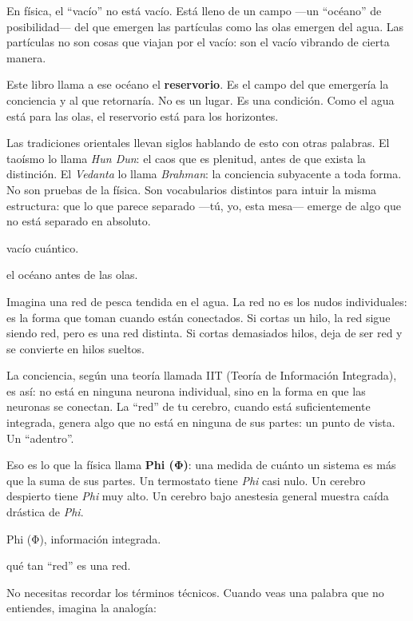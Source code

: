 En física, el “vacío” no está vacío. Está lleno de un campo —un “océano” de posibilidad— del que emergen las partículas como las olas emergen del agua. Las partículas no son cosas que viajan por el vacío: son el vacío vibrando de cierta manera.

Este libro llama a ese océano el \textbf{reservorio}. Es el campo del que emergería la conciencia y al que retornaría. No es un lugar. Es una condición. Como el agua está para las olas, el reservorio está para los horizontes.

Las tradiciones orientales llevan siglos hablando de esto con otras palabras. El taoísmo lo llama \emph{Hun Dun}: el caos que es plenitud, antes de que exista la distinción. El \emph{Vedanta} lo llama \emph{Brahman}: la conciencia subyacente a toda forma. No son pruebas de la física. Son vocabularios distintos para intuir la misma estructura: que lo que parece separado —tú, yo, esta mesa— emerge de algo que no está separado en absoluto.

\begin{fisica}
 vacío cuántico.

 el océano antes de las olas.
\end{fisica}
\noindent Imagina una red de pesca tendida en el agua. La red no es los nudos individuales: es la forma que toman cuando están conectados. Si cortas un hilo, la red sigue siendo red, pero es una red distinta. Si cortas demasiados hilos, deja de ser red y se convierte en hilos sueltos.

La conciencia, según una teoría llamada IIT (Teoría de Información Integrada), es así: no está en ninguna neurona individual, sino en la forma en que las neuronas se conectan. La “red” de tu cerebro, cuando está suficientemente integrada, genera algo que no está en ninguna de sus partes: un punto de vista. Un “adentro”.

Eso es lo que la física llama \textbf{Phi (Φ)}: una medida de cuánto un sistema es más que la suma de sus partes. Un termostato tiene \emph{Phi} casi nulo. Un cerebro despierto tiene \emph{Phi} muy alto. Un cerebro bajo anestesia general muestra caída drástica de \emph{Phi}.

\begin{fisica}
 Phi (Φ), información integrada.

 qué tan “red” es una red.
\end{fisica}
\noindent No necesitas recordar los términos técnicos. Cuando veas una palabra que no entiendes, imagina la analogía:

